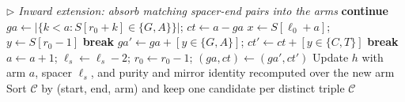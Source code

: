 \documentclass{article}
\begin{document}
\begin{algorithm}
\begin{algorithmic}[1]
\Statex \textit{$\triangleright$ Inward extension: absorb matching spacer-end pairs into the arms}
     \State \textbf{continue} \EndIf
    \State $\textit{ga} \gets \bigl|\{k<a : S[r_0{+}k]\in\{G,A\}\}\bigr|$;\;
           $\textit{ct} \gets a - \textit{ga}$
        \State $x \gets S[\ell_0 + a]$;\; $y \gets S[r_0 - 1]$
         \State \textbf{break} \EndIf
        \State $\textit{ga}' \gets \textit{ga} + [y\in\{G,A\}]$;\;
               $\textit{ct}' \gets \textit{ct} + [y\in\{C,T\}]$
            \State \textbf{break} 
        \EndIf
        \State $a \gets a + 1$;\; $\ell_s \gets \ell_s - 2$;\;
               $r_0 \gets r_0 - 1$;\; $(\textit{ga}, \textit{ct}) \gets (\textit{ga}', \textit{ct}')$
    \EndWhile
    \State Update $h$ with arm $a$, spacer $\ell_s$, and purity and mirror
           identity recomputed over the new arm
\EndFor
\State Sort $\mathcal{C}$ by (start, end, arm) and keep one candidate per
       distinct triple 
\State \Return $\mathcal{C}$
\end{algorithmic}
\end{algorithm}

\clearpage
\end{document}

